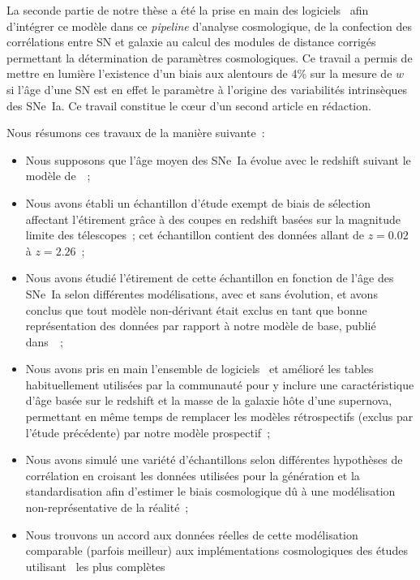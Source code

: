 \documentclass[../main/main.tex]{subfiles}
\begin{document}
La seconde partie de notre thèse a été la prise en main des logiciels \snana\
afin d'intégrer ce modèle dans ce \textit{pipeline} d'analyse cosmologique, de
la confection des corrélations entre SN et galaxie au calcul des modules de
distance corrigés permettant la détermination de paramètres cosmologiques. Ce
travail a permis de mettre en lumière l'existence d'un biais aux alentours de
4\% sur la mesure de $w$ si l'âge d'une SN est en effet le paramètre à l'origine
des variabilités intrinsèques des SNe~Ia. Ce travail constitue le cœur d'un
second article en rédaction.

Nous résumons ces travaux de la manière suivante~:
\begin{itemize}
    \item Nous supposons que l'âge moyen des SNe~Ia évolue avec le
        redshift suivant le modèle de~\cite{rigault2020}~;
    \item Nous avons établi un échantillon d'étude exempt de biais de sélection
        affectant l'étirement grâce à des coupes en redshift basées sur la
        magnitude limite des télescopes~; cet échantillon contient des données
        allant de $z = \num{0.02}$ à $z = \num{2.26}$~;
    \item Nous avons étudié l'étirement de cette échantillon en fonction de
        l'âge des SNe~Ia selon différentes modélisations, avec et sans
        évolution, et avons conclus que tout modèle non-dérivant était exclus en
        tant que bonne représentation des données par rapport à notre modèle de
        base, publié dans~\cite{nicolas2021}~;
    \item Nous avons pris en main l'ensemble de logiciels \snana\ et amélioré
        les tables habituellement utilisées par la communauté pour y inclure une
        caractéristique d'âge basée sur le redshift et la masse de la galaxie
        hôte d'une supernova, permettant en même temps de remplacer les modèles
        rétrospectifs (exclus par l'étude précédente) par notre modèle
        prospectif~;
    \item Nous avons simulé une variété d'échantillons selon différentes
        hypothèses de corrélation en croisant les données utilisées pour la
        génération et la standardisation afin d'estimer le biais cosmologique dû
        à une modélisation non-représentative de la réalité~;
    \item Nous trouvons un accord aux données réelles de cette modélisation
        comparable (parfois meilleur) aux implémentations cosmologiques des
        études utilisant \snana\ les plus complètes \citep{scolnic2016,
}
\end{itemize}
\end{document}

